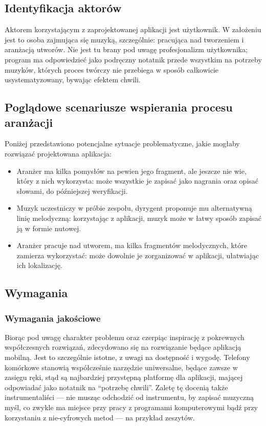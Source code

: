 \subsection{Identyfikacja aktorów}
Aktorem korzystającym z zaprojektowanej aplikacji jest użytkownik.
W założeniu jest to osoba zajmująca się muzyką, szczególnie: pracująca nad tworzeniem i aranżacją utworów.
Nie jest tu brany pod uwagę profesjonalizm użytkownika; program ma odpowiedzieć jako podręczny notatnik przede wszystkim
na potrzeby muzyków, których proces twórczy nie przebiega w sposób całkowicie usystematyzowany, bywając efektem chwili.

\subsection{Poglądowe scenariusze wspierania procesu aranżacji}
Poniżej przedstawiono potencjalne sytuacje problematyczne, jakie mogłaby rozwiązać projektowana aplikacja:
\begin{itemize}
	\item Aranżer ma kilka pomysłów na pewien jego fragment, ale jeszcze nie wie, który z nich wykorzysta:
	      może wszystkie je zapisać jako nagrania oraz opisać słowami, do późniejszej weryfikacji.
	\item Muzyk uczestniczy w próbie zespołu, dyrygent proponuje mu alternatywną linię melodyczną:
	      korzystając z aplikacji, muzyk może w łatwy sposób zapisać ją w formie nutowej.
	\item Aranżer pracuje nad utworem, ma kilka fragmentów melodycznych, które zamierza wykorzystać:
	      może dowolnie je zorganizować w aplikacji, ułatwiając ich lokalizację.
\end{itemize}

\subsection{Wymagania}
\subsubsection{Wymagania jakościowe}
Biorąc pod uwagę charakter problemu oraz czerpiąc inspirację z pokrewnych współczesnych rozwiązań,
zdecydowano się na rozwiązanie będące aplikacją mobilną.
Jest to szczególnie istotne, z uwagi na dostępność i wygodę.
Telefony komórkowe stanowią współcześnie narzędzie uniwersalne, będące zawsze w zasięgu ręki,
stąd są najbardziej przystępną platformę dla aplikacji, mającej odpowiadać jako notatnik na \enquote{potrzebę chwili}.
Zaletę tę docenią także instrumentaliści — nie musząc odchodzić od instrumentu, by zapisać muzyczną myśl,
co zwykle ma miejsce przy pracy z programami komputerowymi bądź przy korzystaniu z nie-cyfrowych metod
— na przykład zeszytów.

